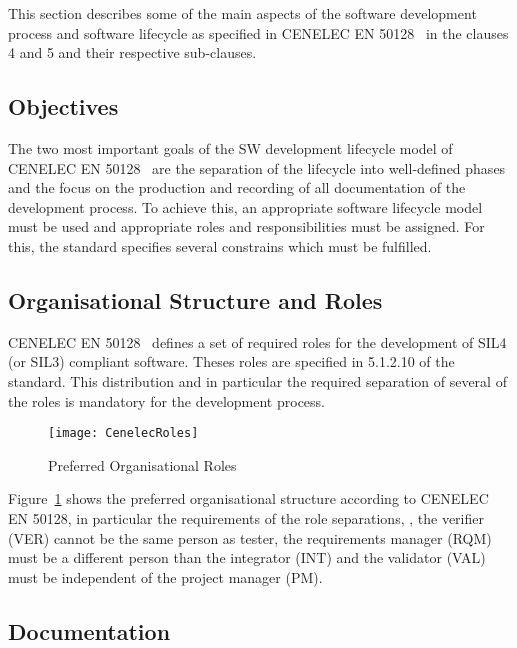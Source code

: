 
This section describes some of the main aspects of the software development
process and software lifecycle as specified in CENELEC EN 50128~\cite{EN-50128}
in the clauses 4 and 5 and their respective sub-clauses.

\subsection{Objectives}
\label{sec:objectives}

The two most important goals of the SW development lifecycle model of CENELEC EN
50128~\cite{EN-50128} are the separation of the lifecycle into well-defined
phases and the focus on the production and recording of all documentation of the
development process. To achieve this, an appropriate software lifecycle model
must be used and appropriate roles and responsibilities must be assigned. For
this, the standard specifies several constrains which must be fulfilled.

\subsection{Organisational Structure and Roles}
\label{sec:organ-struct-roles}

CENELEC EN 50128~\cite{EN-50128} defines a set of required roles for the
development of SIL4 (or SIL3) compliant software. Theses roles are specified in
5.1.2.10 of the standard. This distribution and in particular the required
separation of several of the roles is mandatory for the development process.

\begin{figure}[ht]
  \centering
  \texttt{[image: CenelecRoles]}
  \caption{Preferred Organisational Roles~\cite{EN-50128}}
  \label{fig:preferred-roles}
\end{figure}

Figure~\ref{fig:preferred-roles} shows the preferred organisational structure
according to CENELEC EN 50128, in particular the requirements of the role
separations, \eg, the verifier (VER) cannot be the same person as tester, the
requirements manager (RQM) must be a different person than the integrator (INT)
and the validator (VAL) must be independent of the project manager (PM).

\subsection{Documentation}
\label{sec:documentation}

